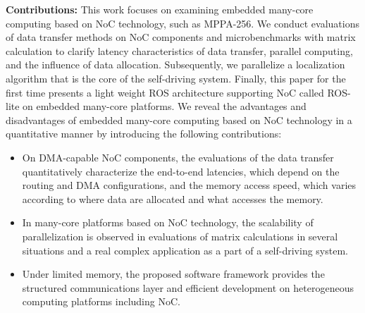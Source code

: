 
\textbf{Contributions:}
This work focuses on examining embedded many-core computing based on NoC technology, such as MPPA-256.
We conduct evaluations of data transfer methods on NoC components and microbenchmarks with matrix calculation to clarify latency characteristics of data transfer, parallel computing, and the influence of data allocation.
Subsequently, we parallelize a localization algorithm that is the core of the self-driving system.
Finally, this paper for the first time presents a light weight ROS architecture supporting NoC called ROS-lite on embedded many-core platforms.
We reveal the advantages and disadvantages of embedded many-core computing based on NoC technology in a quantitative manner by introducing the following contributions:

\begin{itemize}
  \setlength{\leftskip}{-5mm}
  \item On DMA-capable NoC components, the evaluations of the data transfer quantitatively characterize the end-to-end latencies, which depend on the routing and DMA configurations, and the memory access speed, which varies according to where data are allocated and what accesses the memory.
  \item In many-core platforms based on NoC technology, the scalability of parallelization is observed in evaluations of matrix calculations in several situations and a real complex application as a part of a self-driving system.
  \item Under limited memory, the proposed software framework provides the structured communications layer and efficient development on heterogeneous computing platforms including NoC.
\end{itemize}

